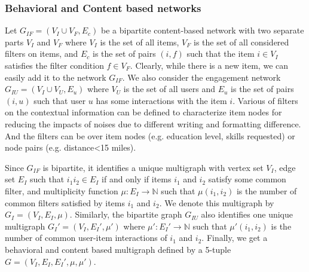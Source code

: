 \documentclass[manuscript,screen,review]{acmart}
\begin{document}
\subsubsection{Behavioral and Content based networks}
Let $G_{IF}=(V_I\cup V_F,E_c)$ be a bipartite content-based network with two separate parts $V_I$ and $V_F$ where $V_I$ is the set of all items, $V_F$ is the set of all considered filters on items, and $E_c$ is the set of pairs $(i,f)$ such that the item $i\in V_I$ satisfies the filter condition $f\in V_F$. Clearly, while there is a new item, we can easily add it to the network $G_{IF}$. We also consider the engagement network $G_{IU}=(V_I\cup V_U,E_u)$ where $V_U$ is the set of all users and $E_u$ is the set of pairs $(i,u)$ such that user $u$ has some interactions with the item $i$. Various of filters on the contextual information can be defined to characterize item nodes for reducing the impacts of noises due to different writing and formatting difference. And the filters can be over item nodes (e.g. education level, skills requested) or node pairs (e.g. distance<15 miles).

Since $G_{IF}$ is bipartite, it identifies a unique multigraph with vertex set $V_I$, edge set $E_I$ such that $i_1i_2\in E_I$ if and only if items $i_1$ and $i_2$ satisfy some common filter, and multiplicity function $\mu: E_I\to \mathbb{N}$ such that $\mu(i_1,i_2)$ is the number of common filters satisfied by items $i_1$ and $i_2$. We denote this multigraph by $G_I=(V_I,E_I,\mu)$. Similarly, the bipartite graph $G_{IU}$ also identifies one unique multigraph $G_I'=(V_I,E_I',\mu')$ where $\mu': E_I'\to\mathbb{N}$ such that $\mu'(i_1,i_2)$ is the number of common user-item interactions of $i_1$ and $i_2$. Finally, we get a behavioral and content based multigraph defined by a 5-tuple $G=(V_I,E_I,E_I',\mu,\mu')$.
\end{document}
